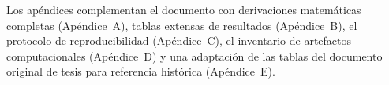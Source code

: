 Los apéndices complementan el documento con derivaciones matemáticas completas (Apéndice~A), tablas extensas de resultados (Apéndice~B), el protocolo de reproducibilidad (Apéndice~C), el inventario de artefactos computacionales (Apéndice~D) y una adaptación de las tablas del documento original de tesis para referencia histórica (Apéndice~E).

